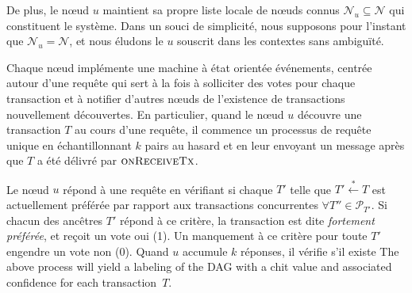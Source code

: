 De plus, le nœud $u$ maintient sa propre liste locale de nœuds connus $\mathcal{N}_u \subseteq \mathcal{N}$ qui constituent le système.
Dans un souci de simplicité, nous supposons pour l'instant que $\mathcal{N}_u = \mathcal{N}$, et nous éludons le $u$ souscrit dans les contextes sans ambiguïté.
%

Chaque nœud implémente une machine à état orientée événements, centrée autour d'une requête qui sert à la fois à solliciter des votes pour chaque transaction et à notifier d'autres nœuds de l'existence de transactions nouvellement découvertes.
En particulier, quand le nœud $u$ découvre une transaction $T$ au cours d'une requête, il commence un processus de requête unique %
en échantillonnant $k$ pairs au hasard et en leur envoyant un message après que $T$ a été délivré par $\textsc{onReceiveTx}$.

Le nœud $u$ répond à une requête en vérifiant si chaque $T'$ telle que $T' \stackrel{*}{\gets} T$ est actuellement préférée par rapport aux transactions concurrentes $\forall T'' \in \mathcal{P}_{T'}$.
Si chacun des ancêtres $T'$ répond à ce critère, la transaction est dite \emph{fortement préférée}, et reçoit un vote oui (1). Un manquement à ce critère pour toute $T'$ engendre un vote non (0).
Quand $u$ accumule $k$ réponses, il vérifie s'il existe
The above process will yield a labeling of the DAG with a chit value and associated confidence for each transaction~$T$.

